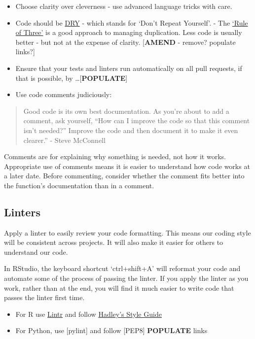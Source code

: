\documentclass[]{book}
\providecommand{\tightlist}{%
  \setlength{\itemsep}{0pt}\setlength{\parskip}{0pt}}
\begin{document}
\begin{itemize}
\tightlist
\item
  Choose clarity over cleverness - use advanced language tricks with care.
\item
  Code should be \href{https://en.wikipedia.org/wiki/Don\%27t_repeat_yourself}{DRY} - which stands for `Don't Repeat Yourself'. - The \href{https://en.wikipedia.org/wiki/Rule_of_three_(computer_programming)}{`Rule of Three'} is a good approach to managing duplication. Less code is usually better - but not at the expense of clarity. {[}\textbf{AMEND} - remove? populate links?{]}
\item
  Ensure that your tests and linters run automatically on all pull requests, if that is possible, by \ldots{[}\textbf{POPULATE}{]}
\item
  Use code comments judiciously:
\end{itemize}

\begin{quote}
Good code is its own best documentation. As you're about to add a comment, ask yourself, ``How can I improve the code so that this comment isn't needed?'' Improve the code and then document it to make it even clearer.'' - Steve McConnell
\end{quote}

Comments are for explaining why something is needed, not how it works. Appropriate use of comments means it is easier to understand how code works at a later date. Before commenting, consider whether the comment fits better into the function's documentation than in a comment.

\hypertarget{linter}{%
\subsection*{Linters}\label{linter}}

Apply a linter to easily review your code formatting. This means our coding style will be consistent across projects. It will also make it easier for others to understand our code.

In RStudio, the keyboard shortcut `ctrl+shift+A' will reformat your code and automate some of the process of passing the linter. If you apply the linter as you work, rather than at the end, you will find it much easier to write code that passes the linter first time.

\begin{itemize}
\tightlist
\item
  For R use \href{https://cran.r-project.org/web/packages/lintr/readme/README.html}{Lintr} and follow \href{http://adv-r.had.co.nz/Style.html}{Hadley's Style Guide}\\
\item
  For Python, use {[}pylint{]} and follow {[}PEP8{]} \textbf{POPULATE} links
\end{itemize}
\end{document}
